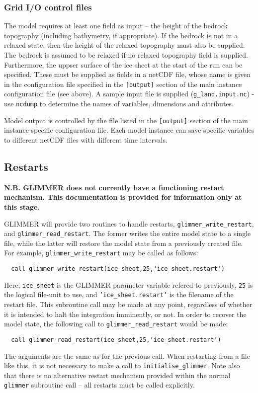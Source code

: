 \subsubsection{Grid I/O control files}
The model requires at least one field as input -- the height of the bedrock
topography (including bathymetry, if appropriate). If the bedrock is not in a relaxed state, then
the height of the relaxed topography must also be supplied. The bedrock is assumed to be relaxed 
if no relaxed topography field is supplied. Furthermore, the uppser surface of the ice sheet at the 
start of the run can be specified. These must be supplied as fields in a
netCDF file, whose name is given in the configuration file specified in the
\texttt{[output]} section of the main instance configuration file (see
above). A sample input file is supplied (\texttt{g\_land.input.nc}) - use
\texttt{ncdump} to determine the names of variables, dimensions and attributes.

Model output is controlled by the file listed in the \texttt{[output]} section
of the main instance-specific configuration file. Each model instance can save
specific variables to different netCDF files with different time intervals.
%
\subsection{Restarts}
%
{\bf N.B. GLIMMER does not currently have a functioning restart
  mechanism. This documentation is provided for information only at this stage.}

GLIMMER will provide two routines to handle restarts,
\texttt{glimmer\_write\_restart}, and \texttt{glimmer\_read\_restart}. The
former writes the entire model state to a single file, while the latter will
restore the model state from a previously created
file. For example, \texttt{glimmer\_write\_restart} may be called as follows:
%
\begin{verbatim}
  call glimmer_write_restart(ice_sheet,25,'ice_sheet.restart')
\end{verbatim}
%
Here, \texttt{ice\_sheet} is the GLIMMER parameter variable refered to
previously, \texttt{25} is the logical file-unit to use, and
\texttt{'ice\_sheet.restart'} is the filename of the restart file. This
subroutine call may be made at any point, regardless of whether it is intended
to halt the integration imminently, or not. In order to recover the model
state, the following call to \texttt{glimmer\_read\_restart} would be made:
%
\begin{verbatim}
  call glimmer_read_restart(ice_sheet,25,'ice_sheet.restart')
\end{verbatim}
%
The arguments are the same as for the previous call. When restarting from a
file like this, it is not necessary to make a call to
\texttt{initialise\_glimmer}. Note also that there is no alternative restart mechanism
provided within the normal \texttt{glimmer} subroutine call -- all restarts
must be called explicitly.

